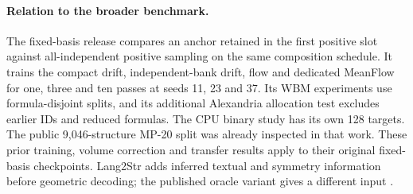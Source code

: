 \paragraph{Relation to the broader benchmark.}
The fixed-basis release compares an anchor retained in the first positive slot against all-independent positive sampling on the same composition schedule. It trains the compact drift, independent-bank drift, flow and dedicated MeanFlow for one, three and ten passes at seeds 11, 23 and 37. Its WBM experiments use formula-disjoint splits, and its additional Alexandria allocation test excludes earlier IDs and reduced formulas. The CPU binary study has its own 128 targets. The public 9,046-structure MP-20 split was already inspected in that work. These prior training, volume correction and transfer results apply to their original fixed-basis checkpoints. Lang2Str adds inferred textual and symmetry information before geometric decoding; the published oracle variant gives a different input \cite{lang2str}.
